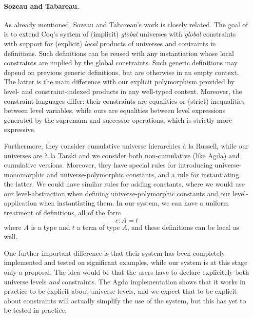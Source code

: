 \documentclass[11pt,a4paper]{article}
\theoremstyle{definition}
\newcommand{\UU}{\mathsf{U}}
\newcommand{\Type}{\mathsf{Type}}
\begin{document}
\paragraph{Sozeau and Tabareau.}

As already mentioned, Sozeau and Tabareau's \cite{SozeauTabareau:coq} work is closely related. {\color{red}The goal of \cite{SozeauTabareau:coq} is to extend Coq's system of (implicit) \emph{global} universes with \emph{global} constraints with support for (explicit) \emph{local} products of universes and contraints in definitions. Such definitions can be reused with any instantiation whose local constraints are implied by the global constraints. Such generic definitions may depend on previous generic definitions, but are otherwise in an empty context. The latter is the main difference with our explicit polymorphism provided by level- and constraint-indexed products in any well-typed context.} Moreover, the constraint languages differ: their constraints are equalities or (strict) inequalities between level variables, while ours are equalities between level expressions generated by the supremum and successor operations, which is strictly more expressive.

Furthermore, they consider cumulative universe hierarchies  \`a la Russell, while
our universes are \`a la Tarski and we consider both non-cumulative (like Agda) and cumulative versions.
Moreover, they have special rules for introducing universe-monomorphic and universe-polymorphic constants, and a rule for instantiating the latter. We could have similar rules for adding constants, where we would use our level-abstraction when defining universe-polymorphic constants and our level-application when instantiating them.
In our system, we can have a uniform treatment of definitions, all of the form
$$ c : A = t$$
where $A$ is a type and $t$ a term of type $A$, and these definitions can be local as well.

%
One further important difference is that their system has been completely implemented and tested on
significant examples, while our system is at this stage only a proposal. The idea would be that the
users have to declare explicitely both universe levels {\em and} constraints. The Agda implementation
shows that it works in practice to be explicit about universe levels, and we expect that to be
explicit about constraints will actually simplify the use of the system, but this has yet to be tested in
practice.
\end{document}
